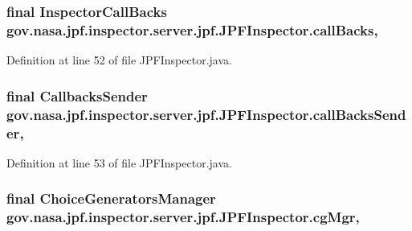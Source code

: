 \subsubsection[{\texorpdfstring{call\+Backs}{callBacks}}]{\setlength{\rightskip}{0pt plus 5cm}final {\bf Inspector\+Call\+Backs} gov.\+nasa.\+jpf.\+inspector.\+server.\+jpf.\+J\+P\+F\+Inspector.\+call\+Backs\hspace{0.3cm}{\ttfamily [protected]}, {\ttfamily [inherited]}}\hypertarget{classgov_1_1nasa_1_1jpf_1_1inspector_1_1server_1_1jpf_1_1_j_p_f_inspector_a64c8af9d5f44108e09eee97c3dd16484}{}\label{classgov_1_1nasa_1_1jpf_1_1inspector_1_1server_1_1jpf_1_1_j_p_f_inspector_a64c8af9d5f44108e09eee97c3dd16484}


Definition at line 52 of file J\+P\+F\+Inspector.\+java.

\subsubsection[{\texorpdfstring{call\+Backs\+Sender}{callBacksSender}}]{\setlength{\rightskip}{0pt plus 5cm}final {\bf Callbacks\+Sender} gov.\+nasa.\+jpf.\+inspector.\+server.\+jpf.\+J\+P\+F\+Inspector.\+call\+Backs\+Sender\hspace{0.3cm}{\ttfamily [protected]}, {\ttfamily [inherited]}}\hypertarget{classgov_1_1nasa_1_1jpf_1_1inspector_1_1server_1_1jpf_1_1_j_p_f_inspector_af4fc001574ec77bd49b15f850aabe8c8}{}\label{classgov_1_1nasa_1_1jpf_1_1inspector_1_1server_1_1jpf_1_1_j_p_f_inspector_af4fc001574ec77bd49b15f850aabe8c8}


Definition at line 53 of file J\+P\+F\+Inspector.\+java.

\subsubsection[{\texorpdfstring{cg\+Mgr}{cgMgr}}]{\setlength{\rightskip}{0pt plus 5cm}final {\bf Choice\+Generators\+Manager} gov.\+nasa.\+jpf.\+inspector.\+server.\+jpf.\+J\+P\+F\+Inspector.\+cg\+Mgr\hspace{0.3cm}{\ttfamily [protected]}, {\ttfamily [inherited]}}\hypertarget{classgov_1_1nasa_1_1jpf_1_1inspector_1_1server_1_1jpf_1_1_j_p_f_inspector_af3fe3fe51df6768e49bb165d72fe3229}{}\label{classgov_1_1nasa_1_1jpf_1_1inspector_1_1server_1_1jpf_1_1_j_p_f_inspector_af3fe3fe51df6768e49bb165d72fe3229}



